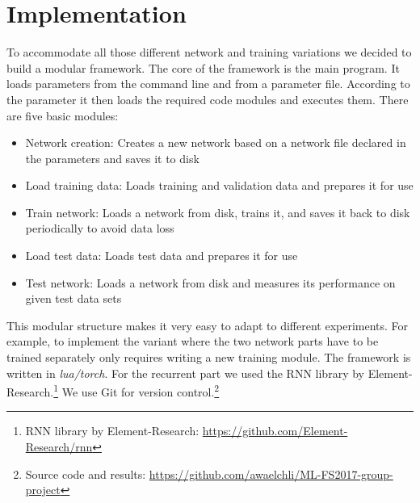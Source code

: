 \documentclass[11pt]{article}
\begin{document}
\newpage
\section{Implementation}
To accommodate all those different network and training variations we decided to build a modular framework. The core of the framework is the main program. It loads parameters from the command line and from a parameter file. According to the parameter it then loads the required code modules and executes them. There are five basic modules:
\begin{itemize}
	\item	Network creation: Creates a new network based on a network file declared in the parameters and saves it to disk
	\item	Load training data: Loads training and validation data and prepares it for use
	\item	Train network: Loads a network from disk, trains it, and saves it back to disk periodically to avoid data loss
	\item	Load test data: Loads test data and prepares it for use
	\item	Test network: Loads a network from disk and measures its performance on given test data sets
\end{itemize}
This modular structure makes it very easy to adapt to different experiments. For example, to implement the variant where the two network parts have to be trained separately only requires writing a new training module.
The framework is written in \emph{lua/torch}. 
For the recurrent part we used the RNN library by Element-Research.\footnote{RNN library by Element-Research: \url{https://github.com/Element-Research/rnn}}
We use Git for version control.\footnote{Source code and results: \url{https://github.com/awaelchli/ML-FS2017-group-project}}
\end{document}
